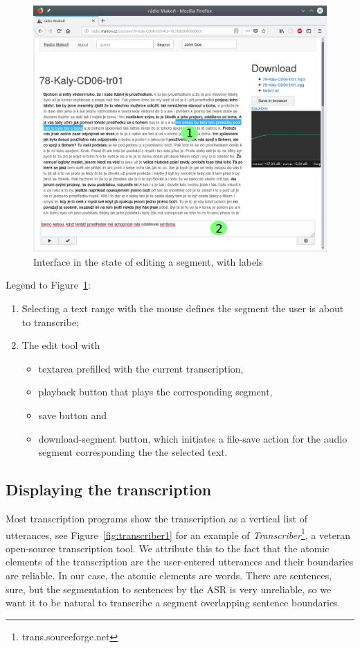 \documentclass{svproc}
\begin{document}
\begin{figure}[htpb]
\includegraphics[scale=0.6]{rc/radio-makon-en-2-lab.png}
\caption{Interface in the state of editing a segment, with labels}
\label{fig:scn2lab}
\end{figure}

Legend to Figure~\ref{fig:scn2lab}:
\begin{enumerate}
\item{
    Selecting a text range with the mouse defines the segment the user is about
    to transcribe;
}
\item{
    The edit tool with
    \begin{itemize}
    \item{textarea prefilled with the current transcription,}
    \item{playback button that plays the corresponding segment,}
    \item{save button and}
    \item{download-segment button, which initiates a file-save action for the
    audio segment corresponding the the selected text.}
    \end{itemize}
}
\end{enumerate}

\subsection{Displaying the transcription}

Most transcription programs show the transcription as a vertical list of
utterances, see Figure~\ref{fig:transcriber1} for an example of
{\em{Transcriber}}\footnote{trans.sourceforge.net}, a veteran open-source
transcription tool. We attribute this to the fact that the atomic elements of
the transcription are the user-entered utterances and their boundaries are
reliable. In our case, the atomic elements are words. There are sentences, sure,
but the segmentation to sentences by the ASR is very unreliable, so we want it
to be natural to transcribe a segment overlapping sentence boundaries.
\end{document}
